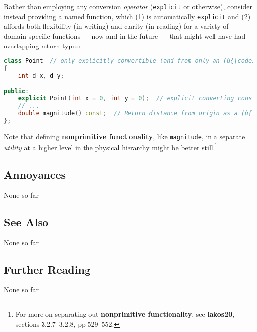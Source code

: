 Rather than employing any conversion \emph{operator} (\texttt{explicit}
or otherwise), consider instead providing a named function, which (1) is
automatically \texttt{explicit} and (2) affords both flexibility (in
writing) and clarity (in reading) for a variety of domain-specific
functions --- now and in the future --- that might well have had
overlapping return types:

\begin{lstlisting}[language=C++]
class Point  // only explicitly convertible (and from only an (ù{\codeincomments{int}}ù))
{
    int d_x, d_y;

public:
    explicit Point(int x = 0, int y = 0);  // explicit converting constructor
    // ...
    double magnitude() const;  // Return distance from origin as a (ù{\codeincomments{double}}ù).
};
\end{lstlisting}
    
\noindent Note that defining \textbf{nonprimitive functionality}, like
\texttt{magnitude}, in a separate \emph{utility} at a higher level in the
physical hierarchy might be better still.{\cprotect\footnote{For more on
separating out \textbf{nonprimitive functionality}, see
  \textbf{{lakos20}}, sections 3.2.7--3.2.8, pp 529--552.}}

\subsection[Annoyances]{Annoyances}\label{annoyances}

None so far

\subsection[See Also]{See Also}\label{see-also}

None so far

\subsection[Further Reading]{Further Reading}\label{further-reading}

None so far

